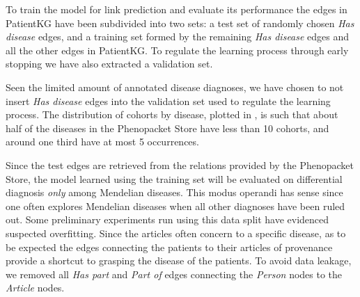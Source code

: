To train the model for link prediction and evaluate its performance the edges in PatientKG have been subdivided into two sets: a test set of randomly chosen \emph{Has disease} edges, and a training set formed by the remaining \emph{Has disease} edges and all the other edges in PatientKG. To regulate the learning process through early stopping we have also extracted a validation set.

Seen the limited amount of annotated disease diagnoses, we have chosen to not insert \emph{Has disease} edges into the validation set used to regulate the learning process. The distribution of cohorts by disease, plotted in , is such that about half of the diseases in the Phenopacket Store have less than 10 cohorts, and around one third have at most 5 occurrences.

Since the test edges are retrieved from the relations provided by the Phenopacket Store, the model learned using the training set will be evaluated on differential diagnosis \emph{only} among Mendelian diseases. This modus operandi has sense since one often explores Mendelian diseases when all other diagnoses have been ruled out. 
Some preliminary experiments run using this data split have evidenced suspected overfitting. Since the articles often concern to a specific disease, as to be expected the edges connecting the patients to their articles of provenance provide a shortcut to grasping the disease of the patients. To avoid data leakage, we removed all \emph{Has part} and \emph{Part of} edges connecting the \emph{Person} nodes to the \emph{Article} nodes. 

